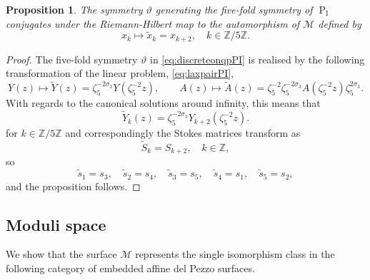 \documentclass[a4paper,reqno]{amsart}
\numberwithin{equation}{section}
\newcommand{\Z}{\mathbb{Z}}
\newcommand{\pain}[1]{\operatorname{P}_{\mathrm{#1}}}
\newtheorem{proposition}[theorem]{Proposition}
\numberwithin{equation}{section}
\begin{document}
\begin{proposition}
    The symmetry $\vartheta$ generating the five-fold symmetry of $\pain{I}$ conjugates under the Riemann-Hilbert map to the  automorphism of $\mathcal{M}$ defined by 
    \begin{equation*}
        x_k \mapsto \widetilde{x}_k=x_{k+2},\quad k\in\mathbb{Z}/5\mathbb{Z}.
    \end{equation*}
\end{proposition}
\begin{proof}
    The five-fold symmetry $\vartheta$ in \cref{eq:discreteonqpPI} is realised by the following transformation of the linear problem, \eqref{eq:laxpairPI},
\begin{equation}\label{eq:PIvarthetaonlin}
    Y(z)\mapsto \widetilde{Y}(z)=\zeta_5^{-2\sigma_3}Y(\zeta_5^{-2}z), \qquad A(z)\mapsto \widetilde{A}(z)=\zeta_5^{-2}\zeta_5^{-2\sigma_3} A(\zeta_5^{-2} z) \zeta_5^{2\sigma_3}.
\end{equation}
With regards to the canonical solutions around infinity, this means that
\begin{equation*}
\widetilde{Y}_k(z) =\zeta_5^{-2\sigma_3} Y_{k+2} (\zeta_5^{-2}z).
\end{equation*}
for $k\in\mathbb{Z}/5\mathbb{Z}$ and correspondingly the Stokes matrices transform as 
\begin{equation*}
    \tilde{S}_k = S_{k+2}, \quad k\in \Z,
\end{equation*}
so 
\begin{equation*}
    \tilde{s}_1=s_3,\quad 
    \tilde{s}_2=s_4,\quad
    \tilde{s}_3=s_5,\quad 
    \tilde{s}_4= s_1,\quad 
    \tilde{s}_5= s_2,
\end{equation*}
and the proposition follows.
\end{proof}









\subsection{Moduli space}

We show that the surface $\mathcal{M}$ represents the single isomorphism class in the following category of embedded affine del Pezzo surfaces.
\end{document}
